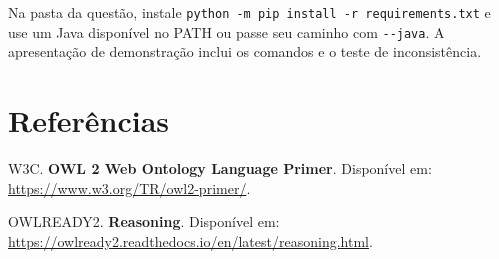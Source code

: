 \documentclass[12pt,a4paper]{article}
\begin{document}
Na pasta da questão, instale \texttt{python -m pip install -r requirements.txt} e use um Java disponível no PATH ou passe seu caminho com \texttt{-{}-java}. A apresentação de demonstração inclui os comandos e o teste de inconsistência.

\section*{Referências}

\noindent [1] W3C. \textbf{OWL 2 Web Ontology Language Primer}. Disponível em: \url{https://www.w3.org/TR/owl2-primer/}.

\noindent [2] OWLREADY2. \textbf{Reasoning}. Disponível em: \url{https://owlready2.readthedocs.io/en/latest/reasoning.html}.
\end{document}
